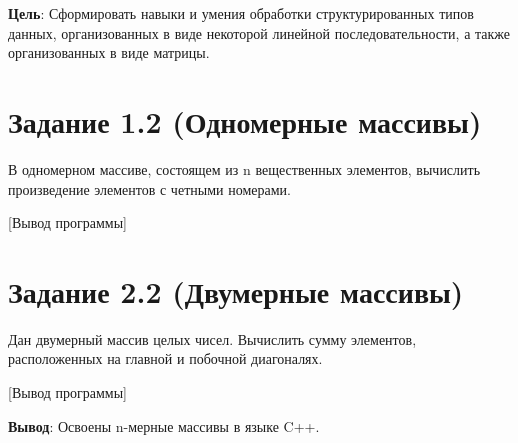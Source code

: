 \documentclass[variant=labwork]{bsuir}
\begin{document}
\maketitle
\mainmatter

\textbf{Цель}: Сформировать навыки и умения обработки структурированных типов
данных, организованных в виде некоторой линейной последовательности, а также
организованных в виде матрицы.

\section*{Задание 1.2 (Одномерные массивы)}

В одномерном массиве, состоящем из n вещественных элементов, вычислить
произведение элементов с четными номерами.


[Вывод программы]


\section*{Задание 2.2 (Двумерные массивы)}

Дан двумерный массив целых чисел. Вычислить сумму элементов, расположенных на
главной и побочной диагоналях.


[Вывод программы]


\textbf{Вывод}: Освоены n-мерные массивы в языке C++.
\end{document}
